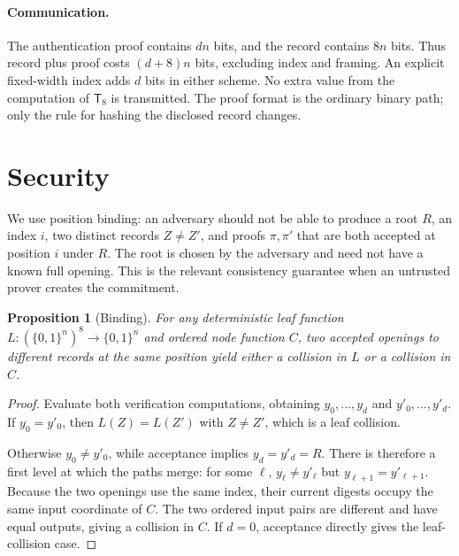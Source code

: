 \documentclass[11pt,letterpaper]{article}
\newtheorem{proposition}[theorem]{Proposition}
\theoremstyle{definition} %
\newcommand{\Tate}{\mathsf{T}_{8}}
\begin{document}
\paragraph{Communication.}
The authentication proof contains $dn$ bits, and the record contains $8n$
bits. Thus record plus proof costs $(d+8)n$ bits, excluding index and framing.
An explicit fixed-width index adds $d$ bits in either scheme. No extra value
from the computation of $\Tate$ is transmitted. The proof format is the
ordinary binary path; only the rule for hashing the disclosed record changes.

\section{Security}
\label{sec:security}
We use position binding: an adversary should not be able to produce a root
$R$, an index $i$, two distinct records $Z\ne Z'$, and proofs $\pi,\pi'$
that are both accepted at position $i$ under $R$. The root is chosen by the
adversary and need not have a known full opening. This is the relevant
consistency guarantee when an untrusted prover creates the commitment.

\begin{proposition}[Binding]
\label{prop:binding}
For any deterministic leaf function $L:(\{0,1\}^n)^8\to\{0,1\}^n$ and
ordered node function $C$, two accepted openings to different records at the
same position yield either a collision in $L$ or a collision in $C$.
\end{proposition}
\begin{proof}
Evaluate both verification computations, obtaining
$y_0,\ldots,y_d$ and $y'_0,\ldots,y'_d$. If $y_0=y'_0$, then
$L(Z)=L(Z')$ with $Z\ne Z'$, which is a leaf collision.

Otherwise $y_0\ne y'_0$, while acceptance implies $y_d=y'_d=R$.
There is therefore a first level at which the paths merge: for some $\ell$,
$y_\ell\ne y'_\ell$ but $y_{\ell+1}=y'_{\ell+1}$. Because the two
openings use the same index, their current digests occupy the same input
coordinate of $C$. The two ordered input pairs are different and have equal
outputs, giving a collision in $C$. If $d=0$, acceptance directly gives the
leaf-collision case.
\end{proof}
\end{document}
